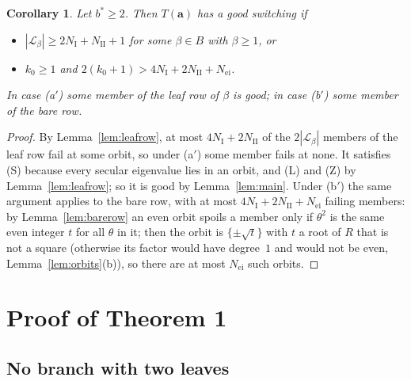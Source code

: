 \documentclass[11pt]{article}
\numberwithin{equation}{section}
\newtheorem{corollary}[lemma]{Corollary}
\theoremstyle{remark}
\newcommand{\cL}{\mathcal L}
\newcommand{\bfa}{\mathbf a}
\newcommand{\NI}{N_{\mathrm I}}
\newcommand{\NII}{N_{\mathrm{II}}}
\newcommand{\Nei}{N_{\mathrm{ei}}}
\begin{document}
\begin{corollary}\label{cor:criteria}
Let $b^*\ge2$. Then $T(\bfa)$ has a good switching if
\begin{itemize}
\item[(a$'$)] $|\cL_\beta|\ge2\NI+\NII+1$ for some $\beta\in B$ with
 $\beta\ge1$, or
\item[(b$'$)] $k_0\ge1$ and $2(k_0+1)>4\NI+2\NII+\Nei$.
\end{itemize}
In case (a$'$) some member of the leaf row of $\beta$ is good; in case (b$'$)
some member of the bare row.
\end{corollary}
\begin{proof}
By Lemma~\ref{lem:leafrow}, at most $4\NI+2\NII$ of the $2|\cL_\beta|$ members
of the leaf row fail at some orbit, so under (a$'$) some member fails at none.
It satisfies (S) because every secular eigenvalue lies in an orbit, and (L) and
(Z) by Lemma~\ref{lem:leafrow}; so it is good by Lemma~\ref{lem:main}. Under
(b$'$) the same argument applies to the bare row, with at most
$4\NI+2\NII+\Nei$ failing members: by Lemma~\ref{lem:barerow} an even orbit
spoils a member only if $\theta^2$ is the same even integer $t$ for all
$\theta$ in it; then the orbit is $\{\pm\sqrt t\}$ with $t$ a root of $R$ that
is not a square (otherwise its factor would have degree~$1$ and would not be
even, Lemma~\ref{lem:orbits}(b)), so there are at most $\Nei$ such orbits.
\end{proof}

\section{Proof of Theorem 1}\label{sec:proof}

\subsection{No branch with two leaves}
\end{document}
